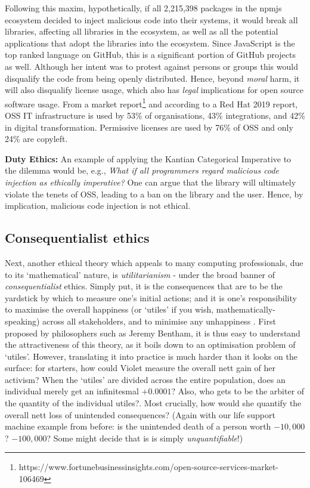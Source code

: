 \documentclass[journal,twocolumn]{IEEEtran}
\begin{document}
Following this maxim, %
hypothetically, if all 2,215,398 packages in the npmjs ecosystem decided to inject malicious code into their systems, it would break all libraries, affecting all libraries in the ecosystem, as well as all the potential applications that adopt the libraries into the ecosystem. 
Since JavaScript is the top ranked language on GitHub, this is a significant portion of GitHub projects as well.
Although her intent was to protest against persons or groups this would disqualify the code from being openly distributed.
Hence, beyond \textit{moral} harm, it will also disqualify license usage, which also has \textit{legal} implications for open source software usage.
From a market report\footnote{https://www.fortunebusinessinsights.com/open-source-services-market-106469} and according to a Red Hat 2019 report, OSS IT infrastructure is used by 53\% of organisations, 43\% integrations, and 42\% in digital transformation. 
Permissive licenses are used by 76\% of OSS and only 24\% are copyleft. 
\begin{tcolorbox}
\textbf{Duty Ethics:} An example of applying the Kantian Categorical Imperative to the dilemma would be, e.g., \textit{What if all programmers regard malicious code injection as ethically imperative?} One can argue that the library will ultimately violate the tenets of OSS, leading to a ban on the library and the user. Hence, by implication, malicious code injection is not ethical.
\end{tcolorbox}

\subsection{Consequentialist ethics}
Next, another ethical theory which appeals to many computing professionals, due to its `mathematical' nature, is \textit{utilitarianism} - under the broad banner of \textit{consequentialist} ethics. Simply put, it is the consequences that are to be the yardstick by which to measure one's initial actions; and it is one's responsibility to maximise the overall happiness (or `utiles' if you wish, mathematically-speaking) across all stakeholders, and to minimise any unhappiness \cite{Rachels2015}. First proposed by philosophers such as Jeremy Bentham, it is thus easy to understand the attractiveness of this theory, as it boils down to an optimisation problem of `utiles'. However, translating it into practice is much harder than it looks on the surface: for starters, how could Violet measure the overall nett gain of her activism? When the `utiles' are divided across the entire population, does an individual merely get an infinitesmal $+0.0001$? Also, who gets to be the arbiter of the quantity of the individual utiles?. Most crucially, how would she quantify the overall nett loss of unintended consequences? (Again with our life support machine example from before: is the unintended death of a person worth $-10,000$? $-100,000$? Some might decide that is is simply \textit{unquantifiable}!)
\end{document}
